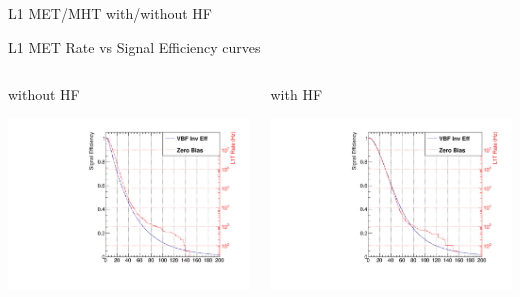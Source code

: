 \documentclass[8pt]{beamer}
\begin{document}
\begin{frame}{L1 MET/MHT with/without HF}
 

\end{frame}

\begin{frame}{L1 MET Rate vs Signal Efficiency curves}

\begin{columns}

\begin{block}{without HF}
 
\centering
\includegraphics[width=\linewidth]{img/METRange3p0/L1TMet_Et.pdf}
 
\end{block}

\begin{block}{with HF}
 
\centering
\includegraphics[width=\linewidth]{img/METRange5p0/L1TMet_Et.pdf}
 
\end{block}

\end{columns}
 
\end{frame}
\end{document}

